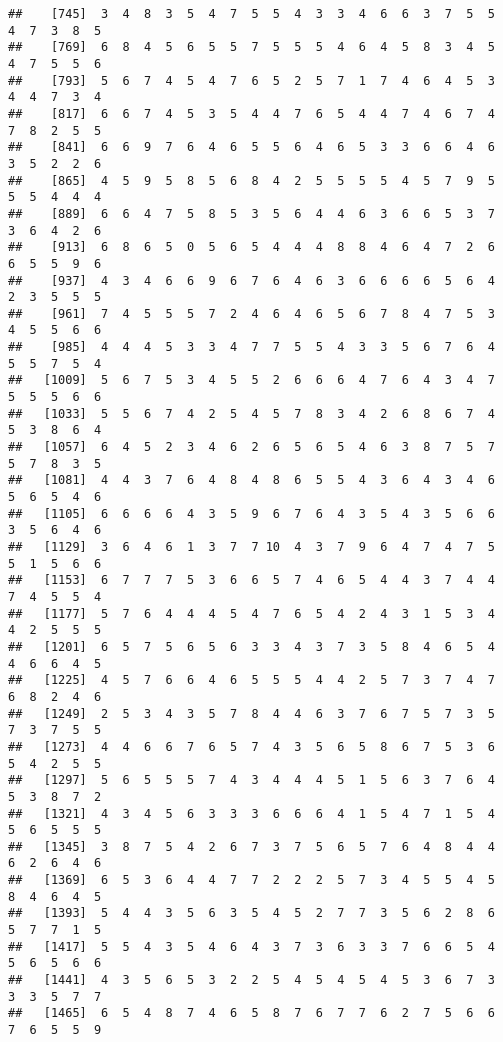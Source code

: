 \documentclass[
]{book}
\begin{document}
\begin{verbatim}
##    [745]  3  4  8  3  5  4  7  5  5  4  3  3  4  6  6  3  7  5  5  4  7  3  8  5
##    [769]  6  8  4  5  6  5  5  7  5  5  5  4  6  4  5  8  3  4  5  4  7  5  5  6
##    [793]  5  6  7  4  5  4  7  6  5  2  5  7  1  7  4  6  4  5  3  4  4  7  3  4
##    [817]  6  6  7  4  5  3  5  4  4  7  6  5  4  4  7  4  6  7  4  7  8  2  5  5
##    [841]  6  6  9  7  6  4  6  5  5  6  4  6  5  3  3  6  6  4  6  3  5  2  2  6
##    [865]  4  5  9  5  8  5  6  8  4  2  5  5  5  5  4  5  7  9  5  5  5  4  4  4
##    [889]  6  6  4  7  5  8  5  3  5  6  4  4  6  3  6  6  5  3  7  3  6  4  2  6
##    [913]  6  8  6  5  0  5  6  5  4  4  4  8  8  4  6  4  7  2  6  6  5  5  9  6
##    [937]  4  3  4  6  6  9  6  7  6  4  6  3  6  6  6  6  5  6  4  2  3  5  5  5
##    [961]  7  4  5  5  5  7  2  4  6  4  6  5  6  7  8  4  7  5  3  4  5  5  6  6
##    [985]  4  4  4  5  3  3  4  7  7  5  5  4  3  3  5  6  7  6  4  5  5  7  5  4
##   [1009]  5  6  7  5  3  4  5  5  2  6  6  6  4  7  6  4  3  4  7  5  5  5  6  6
##   [1033]  5  5  6  7  4  2  5  4  5  7  8  3  4  2  6  8  6  7  4  5  3  8  6  4
##   [1057]  6  4  5  2  3  4  6  2  6  5  6  5  4  6  3  8  7  5  7  5  7  8  3  5
##   [1081]  4  4  3  7  6  4  8  4  8  6  5  5  4  3  6  4  3  4  6  5  6  5  4  6
##   [1105]  6  6  6  6  4  3  5  9  6  7  6  4  3  5  4  3  5  6  6  3  5  6  4  6
##   [1129]  3  6  4  6  1  3  7  7 10  4  3  7  9  6  4  7  4  7  5  5  1  5  6  6
##   [1153]  6  7  7  7  5  3  6  6  5  7  4  6  5  4  4  3  7  4  4  7  4  5  5  4
##   [1177]  5  7  6  4  4  4  5  4  7  6  5  4  2  4  3  1  5  3  4  4  2  5  5  5
##   [1201]  6  5  7  5  6  5  6  3  3  4  3  7  3  5  8  4  6  5  4  4  6  6  4  5
##   [1225]  4  5  7  6  6  4  6  5  5  5  4  4  2  5  7  3  7  4  7  6  8  2  4  6
##   [1249]  2  5  3  4  3  5  7  8  4  4  6  3  7  6  7  5  7  3  5  7  3  7  5  5
##   [1273]  4  4  6  6  7  6  5  7  4  3  5  6  5  8  6  7  5  3  6  5  4  2  5  5
##   [1297]  5  6  5  5  5  7  4  3  4  4  4  5  1  5  6  3  7  6  4  5  3  8  7  2
##   [1321]  4  3  4  5  6  3  3  3  6  6  6  4  1  5  4  7  1  5  4  5  6  5  5  5
##   [1345]  3  8  7  5  4  2  6  7  3  7  5  6  5  7  6  4  8  4  4  6  2  6  4  6
##   [1369]  6  5  3  6  4  4  7  7  2  2  2  5  7  3  4  5  5  4  5  8  4  6  4  5
##   [1393]  5  4  4  3  5  6  3  5  4  5  2  7  7  3  5  6  2  8  6  5  7  7  1  5
##   [1417]  5  5  4  3  5  4  6  4  3  7  3  6  3  3  7  6  6  5  4  5  6  5  6  6
##   [1441]  4  3  5  6  5  3  2  2  5  4  5  4  5  4  5  3  6  7  3  3  3  5  7  7
##   [1465]  6  5  4  8  7  4  6  5  8  7  6  7  7  6  2  7  5  6  6  7  6  5  5  9

\end{verbatim}
\end{document}
